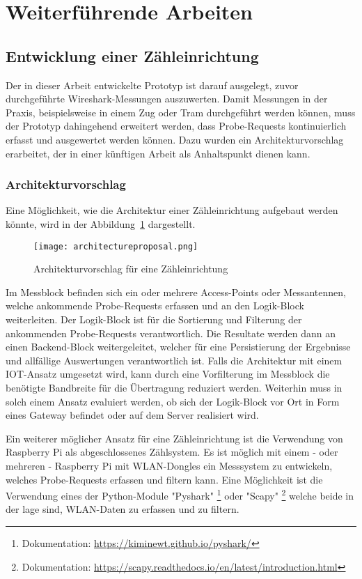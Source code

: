 \section{Weiterführende Arbeiten}
\subsection{Entwicklung einer Zähleinrichtung}
Der in dieser Arbeit entwickelte Prototyp ist darauf ausgelegt, zuvor durchgeführte
Wireshark-Messungen auszuwerten.
Damit Messungen in der Praxis, beispielsweise in einem Zug oder Tram durchgeführt
werden können, muss der Prototyp dahingehend erweitert werden, dass 
Probe-Requests kontinuierlich erfasst und ausgewertet werden können.
Dazu wurden ein Architekturvorschlag erarbeitet, der in einer künftigen 
Arbeit als Anhaltspunkt dienen kann.

\subsubsection*{Architekturvorschlag}
Eine Möglichkeit, wie die Architektur einer Zähleinrichtung aufgebaut werden könnte,
wird in der Abbildung~\ref{figure:architectureproposal} dargestellt.

\begin{figure}[h!]
    \centering
    \texttt{[image: architectureproposal.png]}
    \caption{Architekturvorschlag für eine Zähleinrichtung}
    \label{figure:architectureproposal}
\end{figure}

\clearpage

Im Messblock befinden sich ein oder mehrere Access-Points oder Messantennen, 
welche ankommende Probe-Requests erfassen und an den Logik-Block weiterleiten.
Der Logik-Block ist für die Sortierung und Filterung der ankommenden Probe-Requests
verantwortlich. Die Resultate werden dann an einen Backend-Block weitergeleitet,
welcher für eine Persistierung der Ergebnisse und allfällige Auswertungen 
verantwortlich ist. Falls die Architektur mit einem IOT-Ansatz umgesetzt wird, 
kann durch eine Vorfilterung im Messblock die benötigte Bandbreite für die 
Übertragung reduziert werden. Weiterhin muss in solch einem Ansatz evaluiert 
werden, ob sich der Logik-Block vor Ort in Form eines Gateway befindet oder 
auf dem Server realisiert wird.

Ein weiterer möglicher Ansatz für eine Zähleinrichtung ist die Verwendung 
von Raspberry Pi als abgeschlossenes Zählsystem. Es ist möglich mit einem -
oder mehreren - Raspberry Pi mit WLAN-Dongles ein Messsystem zu entwickeln, 
welches Probe-Requests erfassen und filtern kann. Eine Möglichkeit ist 
die Verwendung eines der Python-Module 
"Pyshark" \footnote{Dokumentation: \url{https://kiminewt.github.io/pyshark/}}
oder "Scapy" \footnote{Dokumentation: \url{https://scapy.readthedocs.io/en/latest/introduction.html}} 
welche beide in der lage sind, WLAN-Daten zu erfassen und zu filtern.


